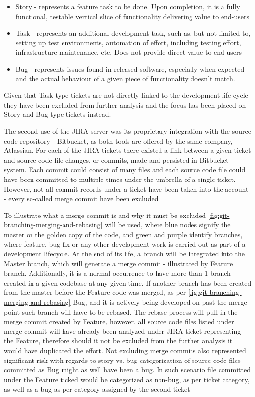 \begin{itemize}
    \item Story - represents a feature task to be done. Upon completion, it is a fully functional, testable vertical slice of functionality delivering value to end-users
    \item Task - represents an additional development task, such as, but not limited to, setting up test environments, automation of effort, including testing effort, infrastructure maintenance, etc. Does not provide direct value to end users
    \item Bug - represents issues found in released software, especially when expected and the actual behaviour of a given piece of functionality doesn't match.
\end{itemize}
Given that Task type tickets are not directly linked to the development life cycle they have been excluded from further analysis and the focus has been placed on Story and Bug type tickets instead.

The second use of the JIRA server was its proprietary integration with the source code repository - Bitbucket, as both tools are offered by the same company, Atlassian. For each of the JIRA tickets there existed a link between a given ticket and source code file changes, or commits, made and persisted in Bitbucket system. 
Each commit could consist of many files and each source code file could have been committed to multiple times under the umbrella of a single ticket. However, not all commit records under a ticket have been taken into the account - every so-called merge commit have been excluded.

To illustrate what a merge commit is and why it must be excluded \ref{fig:git-branching-merging-and-rebasing} will be used, where blue nodes signify the master or the golden copy of the code, and green and purple identify branches, where feature, bug fix or any other development work is carried out as part of a development lifecycle. At the end of its life, a branch will be integrated into the Master branch, which will generate a merge commit - illustrated by Feature branch. Additionally, it is a normal occurrence to have more than 1 branch created in a given codebase at any given time. If another branch has been created from the master before the Feature code was merged, as per \ref{fig:git-branching-merging-and-rebasing} Bug, and it is actively being developed on past the merge point such branch will have to be rebased. The rebase process will pull in the merge commit created by Feature, however, all source code files listed under merge commit will have already been analyzed under JIRA ticket representing the Feature, therefore should it not be excluded from the further analysis it would have duplicated the effort. Not excluding merge commits also represented significant risk with regards to story vs. bug categorization of source code files committed as Bug might as well have been a bug. In such scenario file committed under the Feature ticked would be categorized as non-bug, as per ticket category, as well as a bug as per category assigned by the second ticket.

